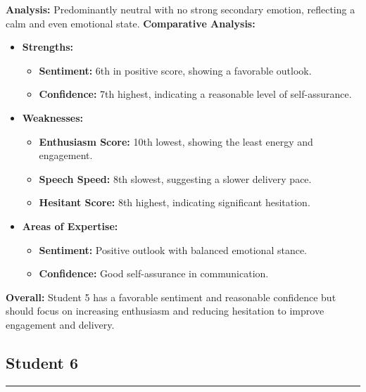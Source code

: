 \documentclass{article}
\begin{document}
    \textbf{Analysis:} Predominantly neutral with no strong secondary emotion, reflecting a calm and even emotional state.
    \vspace{0.2in}
\textbf{Comparative Analysis:}
\begin{itemize}
    \item \textbf{Strengths:}
    \begin{itemize}
        \item \textbf{Sentiment:} 6th in positive score, showing a favorable outlook.
        \item \textbf{Confidence:} 7th highest, indicating a reasonable level of self-assurance.
    \end{itemize}
    \item \textbf{Weaknesses:}
    \begin{itemize}
        \item \textbf{Enthusiasm Score:} 10th lowest, showing the least energy and engagement.
        \item \textbf{Speech Speed:} 8th slowest, suggesting a slower delivery pace.
        \item \textbf{Hesitant Score:} 8th highest, indicating significant hesitation.
    \end{itemize}
    \item \textbf{Areas of Expertise:}
    \begin{itemize}
        \item \textbf{Sentiment:} Positive outlook with balanced emotional stance.
        \item \textbf{Confidence:} Good self-assurance in communication.
    \end{itemize}
\end{itemize}

\textbf{Overall:} Student 5 has a favorable sentiment and reasonable confidence but should focus on increasing enthusiasm and reducing hesitation to improve engagement and delivery.
\vspace{0.3in}

\subsection{Student 6}
\begin{center}
    \color{green}\rule{1\linewidth}{0.7mm}
\end{center}
\end{document}
